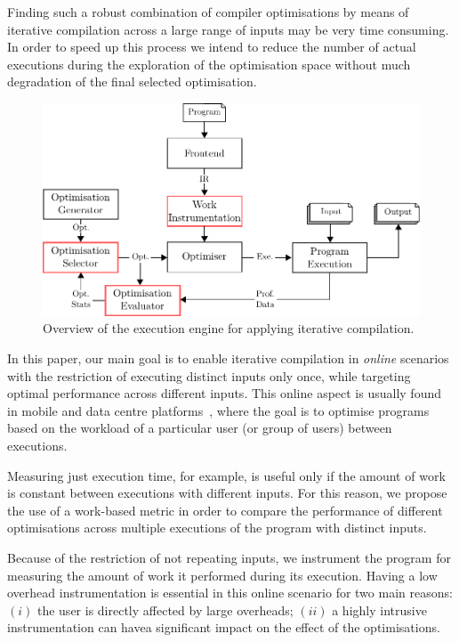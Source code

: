 \documentclass[sigplan,10pt]{acmart}
\theoremstyle{definition}
\newcommand{\itercomp}{{iterative compilation}}
\begin{document}
Finding such a robust combination of compiler optimisations by means of {\itercomp} across a large range of inputs may be very time consuming.
In order to speed up this process we intend to reduce the number of actual executions during the exploration of the optimisation space without much degradation of the final selected optimisation.

\begin{figure}[htb]
    \centering
    \includegraphics[width=\linewidth]{figs/infra-diagram}
    \caption{Overview of the execution engine for applying {\itercomp}.}
    \label{fig:infra-diagram}
\end{figure}

In this paper, our main goal is to enable {\itercomp} in \textit{online} scenarios with the restriction of executing distinct inputs only once, while targeting optimal performance across different inputs.
This online aspect is usually found in mobile and data centre platforms~\cite{chen12b,fang15,mpeis16}, where the goal is to optimise programs based on the workload of a particular user (or group of users) between executions.

Measuring just execution time, for example, is useful only if the amount of work is constant between executions with different inputs.
For this reason, we propose the use of a work-based metric in order to compare the performance of different optimisations across multiple executions of the program with distinct inputs.

Because of the restriction of not repeating inputs, we instrument the program for measuring the amount of work it performed during its execution.
Having a low overhead instrumentation is essential in this online scenario for two main reasons:
$(i)$ the user is directly affected by large overheads;
$(ii)$ a highly intrusive instrumentation can havea significant impact on the effect of the optimisations.
\end{document}
